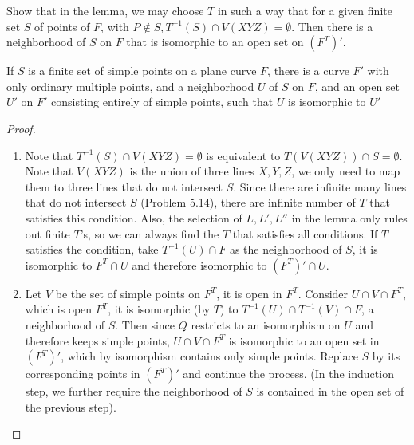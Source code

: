 \documentclass{solution}
\begin{document}
\begin{problem}{7.13}
    \begin{inparaenum}
        \item Show that in the lemma, we may choose $T$ in such a way that for a given finite set $S$ of points of $F$, with $P \notin S, T ^{-1}(S) \cap V(XYZ) = \emptyset$. Then there is a neighborhood of $S$ on $F$ that is isomorphic to an open set on $(F^T)'$.
        \item If $S$ is a finite set of simple points on a plane curve $F$, there is a curve $F'$ with only ordinary multiple points, and a neighborhood $U$ of $S$ on $F$, and an open set $U'$ on $F'$ consisting entirely of simple points, such that $U$ is isomorphic to $U'$
    \end{inparaenum}
\end{problem}

\begin{proof}
    \begin{enumerate}
        \item Note that $T ^{-1} (S) \cap V(XYZ) = \emptyset$ is equivalent to $T(V(XYZ)) \cap S = \emptyset$. Note that $V(XYZ)$ is the union of three lines $X, Y, Z$, we only need to map them to three lines that do not intersect $S$. Since there are infinite many lines that do not intersect $S$ (Problem 5.14), there are infinite number of $T$ that satisfies this condition. Also, the selection of $L, L', L''$ in the lemma only rules out finite $T$'s, so we can always find the $T$ that satisfies all conditions. If $T$ satisfies the condition, take $T ^{-1}(U) \cap F$ as the neighborhood of $S$, it is isomorphic to $F^T \cap U$ and therefore isomorphic to $(F^T)' \cap U$.
        \item Let $V$ be the set of simple points on $F^T$, it is open in $F^T$. Consider $U \cap V \cap F^T$, which is open $F^T$, it is isomorphic (by $T$) to $T ^{-1}(U) \cap T ^{-1}(V) \cap F$, a neighborhood of $S$. Then since $Q$ restricts to an isomorphism on $U$ and therefore keeps simple points, $U \cap V \cap F^T$ is isomorphic to an open set in $(F^T)'$, which by isomorphism contains only simple points. Replace $S$ by its corresponding points in $(F^T)'$ and continue the process. (In the induction step, we further require the neighborhood of $S$ is contained in the open set of the previous step).
    \end{enumerate}
\end{proof}
\end{document}
